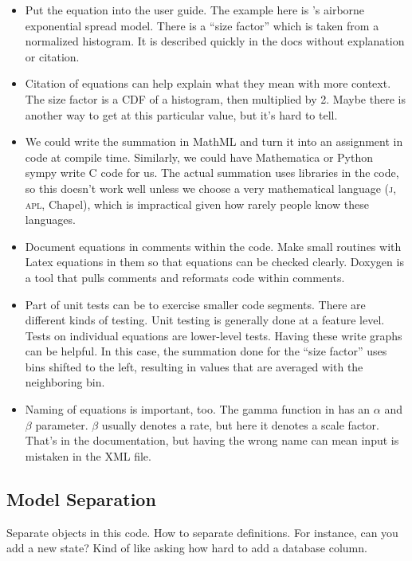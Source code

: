 \documentclass{article}
\begin{document}
\begin{itemize}
  \item Put the equation into the user guide. The example here
        is \naadsm's airborne exponential spread model. There is
        a ``size factor'' which is taken from a normalized histogram.
        It is described quickly in the docs without explanation or citation.

  \item Citation of equations can help explain what they mean with
        more context. The size factor is a CDF of a histogram, then
        multiplied by 2. Maybe there is another way to get at this particular
        value, but it's hard to tell.

  \item We could write the summation in MathML and turn it into an
        assignment in code at compile time. Similarly, we could have
        Mathematica or Python sympy write C code for us. The actual
        summation uses libraries in the code, so this doesn't work
        well unless we choose a very mathematical language
        (\textsc{j}, \textsc{apl}, Chapel), which is
        impractical given how rarely people know these languages.

  \item Document equations in comments within the code. Make small
        routines with Latex equations in them so that equations can
        be checked clearly. Doxygen is a tool that pulls comments
        and reformats code within comments.

  \item Part of unit tests can be to exercise smaller code segments.
        There are different kinds of testing. Unit testing is generally
        done at a feature level. Tests on individual equations are
        lower-level tests. Having these write graphs can be helpful.
        In this case, the summation done for the ``size factor'' uses
        bins shifted to the left, resulting in values that are
        averaged with the neighboring bin.

  \item Naming of equations is important, too. The gamma function
        in \naadsm has an $\alpha$ and $\beta$ parameter. $\beta$
        usually denotes a rate, but here it denotes a scale factor.
        That's in the documentation, but having the wrong name can
        mean input is mistaken in the XML file.
\end{itemize}


\subsection{Model Separation}
Separate objects in this code.
How to separate definitions. For instance, can you add a new
state? Kind of like asking how hard to add a database column.
\end{document}
